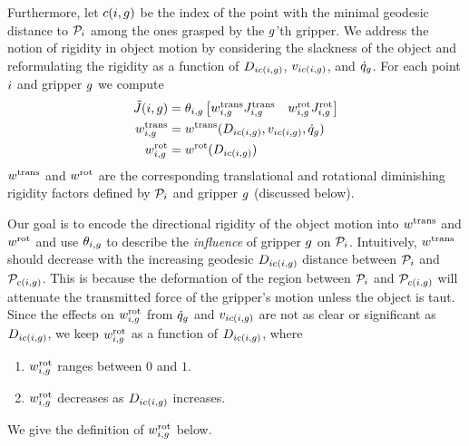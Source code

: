 Furthermore, let $c(i, g)$ be the index of the point with the minimal geodesic distance to $\mathcal{P}_i$ among the ones grasped by the $g$'th gripper. We address the notion of rigidity in object motion by considering the slackness of the object and reformulating the rigidity as a function of $D_{i c(i, g)}$, $v_{i c(i, g)}$, and $\dot{q}_g$. For each point $i$ and gripper $g$ we compute
\begin{equation}
\begin{split}
    \tilde {J}(i, g) 
                        &= \theta_{i, g} \begin{bmatrix} w^{\textrm{trans}}_{i, g} J^{\textrm{trans}}_{i, g} & w^{\textrm{rot}}_{i, g} J^{\textrm{rot}}_{i, g} \end{bmatrix} \\
    w^{\textrm{trans}}_{i, g}    &= w^{\textrm{trans}}(D_{i c(i, g)}, v_{i c(i, g)}, \dot{q}_g) \\
    w^{\textrm{rot}}_{i, g}      &= w^{\textrm{rot}}(D_{i c(i, g)}) \\
\end{split}
\label{eq:trans_rot_rigidity_diminishing_jacobian}
\end{equation}
$w^{\textrm{trans}}$ and $w^{\textrm{rot}}$ are the corresponding translational and rotational diminishing rigidity factors defined by $\mathcal{P}_i$ and gripper $g$ (discussed below). 

Our goal is to encode the directional rigidity of the object motion into $w^{\textrm{trans}}$ and $w^{\textrm{rot}}$ and use $\theta_{i, g}$ to describe the \textit{influence} of gripper $g$ on $\mathcal{P}_i$. Intuitively, $w^{\textrm{trans}}$ should decrease with the increasing geodesic $D_{i c(i, g)}$ distance between $\mathcal{P}_i$ and $\mathcal{P}_{c(i, g)}$. This is because the deformation of the region between $\mathcal{P}_i$ and $\mathcal{P}_{c(i, g)}$ will attenuate the transmitted force of the gripper's motion unless the object is taut. Since the effects on $w^{\textrm{rot}}_{i, g}$ from $\dot{q}_g$ and $v_{i c(i, g)}$ are not as clear or significant as $D_{i c(i, g)}$, we keep $w^{\textrm{rot}}_{i, g}$ as a function of $D_{i c(i, g)}$, where 
\begin{enumerate}
    \item $w^{\textrm{rot}}_{i, g}$ ranges between $0$ and $1$.
    \item $w^{\textrm{rot}}_{i, g}$ decreases as $D_{i c(i, g)}$ increases.
\end{enumerate}
We give the definition of $w^{\textrm{rot}}_{i, g}$ below.

